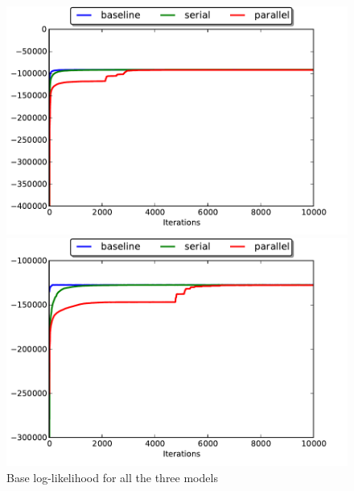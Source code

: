 \begin{figure}[ht]
\begin{minipage}[b]{0.45\linewidth}
\centering
\includegraphics[width=\textwidth]{fig/en_base_lls}
\end{minipage}
\hspace{0.5cm}
\begin{minipage}[b]{0.45\linewidth}
\centering
\includegraphics[width=\textwidth]{fig/ru_base_lls}
\end{minipage}
\caption{\label{fig:basell} Base log-likelihood for all the three models}
\end{figure}

